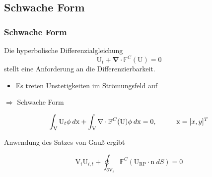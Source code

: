 \documentclass[
	11pt, %
	aspectratio=169, %
]{beamer}
\begin{document}

\subsection{Schwache Form}

\begin{frame}

	\frametitle{Schwache Form}

	Die hyperbolische Differenzialgleichung
	\begin{equation}
		\mathrm{U}_t + \mathbf{\nabla} \cdot \mathbb{F}^C (\mathrm{U}) = 0
	\end{equation}
	stellt eine Anforderung an die Differenzierbarkeit. 
	 \begin{itemize}
	 	\item Es treten Unstetigkeiten im Strömungsfeld auf
	 \end{itemize}
	
	\hspace*{1cm}$\Rightarrow$ Schwache Form

	\begin{equation}
		\int_\mathrm{V}{\mathrm{U}_t \phi \: d\mathrm{x}}+\int_{\mathrm{V}}{\nabla \cdot \mathbb{F}^C (\mathrm{U}) \phi \: d\mathrm{x} }=0, \hspace*{1cm} \mathrm{x} = [x,y]^T
	\end{equation}

	Anwendung des Satzes von Gauß ergibt

	\begin{equation}
		\mathrm{V}_i \mathrm{U}_{i,t} + \oint_{\partial \mathrm{V}_i}{\mathbb{F}^C (\mathrm{U_{RP}}\cdot \mathrm{n} \: dS)}=0
	\end{equation}



	
	
	

\end{frame}
\end{document}
